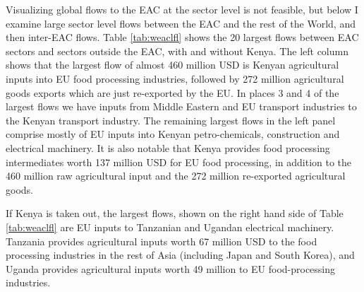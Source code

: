 \documentclass[a4paper]{article}
\begin{document}
Visualizing global flows to the EAC at the sector level is not feasible, but below I examine large sector level flows between the EAC and the rest of the World, and then inter-EAC flows. Table \ref{tab:weaclfl} shows the 20 largest flows between EAC sectors and sectors outside the EAC, with and without Kenya. The left column shows that the largest flow of almost 460 million USD is Kenyan agricultural inputs into EU food processing industries, followed by 272 million agricultural goods exports which are just re-exported by the EU.  In places 3 and 4 of the largest flows we have inputs from Middle Eastern and EU transport industries to the Kenyan transport industry. The remaining largest flows in the left panel comprise mostly of EU inputs into Kenyan petro-chemicals, construction and electrical machinery.  It is also notable that Kenya provides food processing intermediates worth 137 million USD for EU food processing, in addition to the 460 million raw agricultural input and the 272 million re-exported agricultural goods. \newline

If Kenya is taken out, the largest flows, shown on the right hand side of Table \ref{tab:weaclfl} are EU inputs to Tanzanian and Ugandan electrical machinery. Tanzania provides agricultural inputs worth 67 million USD to the food processing industries in the rest of Asia (including Japan and South Korea), and Uganda provides agricultural inputs worth 49 million to EU food-processing industries.  
\end{document}
